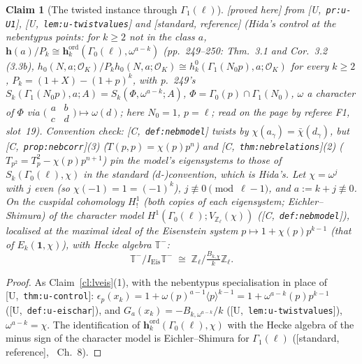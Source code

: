 \documentclass[11pt]{article}
\newtheorem{claim}[theorem]{Claim}
\theoremstyle{remark}
\newcommand{\Z}{\mathbb{Z}}
\newcommand{\Ga}{\Gamma}
\newcommand{\T}{\mathbb{T}}
\newcommand{\HA}[1]{[C,~\texttt{#1}]}      %
\newcommand{\PROVED}{\textsf{[proved here]}}
\newcommand{\STD}{\textsf{[standard, reference]}}
\newcommand{\Ucite}[1]{[U,~\texttt{#1}]}               %
\begin{document}
\begin{claim}[The twisted instance through $\Ga_1(\ell)$]\label{cl:lvtwist}
\PROVED{} from \Ucite{pr:u-U1}, \Ucite{lem:u-twistvalues} and \STD{} (Hida's control at the nebentypus points: for $k\ge2$ \emph{not} in the class $a$,
$\mathbf h(a)/P_{k}\cong\mathbf h^{\mathrm{ord}}_k(\Ga_0(\ell),\omega^{a-k})$ \cite{hida_ens} (pp.~249--250: Thm.~3.1 and Cor.~3.2 (3.3b), $h_0(N,a;\mathcal O_K)/P_kh_0(N,a;\mathcal O_K)\cong
h^{0}_k(\Ga_1(N_0p),a;\mathcal O_K)$ for \emph{every} $k\ge2$, $P_k=(1+X)-(1+p)^{k}$, with p.~249's $S_k(\Ga_1(N_0p),a;A)=S_k(\Phi,\omega^{a-k};A)$, $\Phi=\Ga_0(p)\cap\Ga_1(N_0)$,
$\omega$ a character of $\Phi$ via $\bigl(\begin{smallmatrix}a&b\\c&d\end{smallmatrix}\bigr)\mapsto\omega(d)$; here $N_0=1$, $p=\ell$; read on the page by referee F1, slot~19).
Convention check: \HA{def:nebmodel} twists by $\chi(a_\gamma)=\bar\chi(d_\gamma)$, but \HA{prop:nebcorr}(3) ($T(p,p)=\chi(p)p^{n}$) and \HA{thm:nebrelations}(2)
($T_{p^{2}}=T_p^{2}-\chi(p)p^{n+1}$) pin the model's eigensystems to those of $S_k(\Ga_0(\ell),\chi)$ in the standard ($d$-)convention, which is Hida's. Let $\chi=\omega^{j}$
with $j$ even (so $\chi(-1)=1=(-1)^{k}$), $j\not\equiv0\pmod{\ell-1}$, and $a:=k+j\not\equiv0$. On the cuspidal cohomology $H^{1}_{!}$ (both copies of each eigensystem; Eichler--Shimura) of
the character model $H^{1}(\Ga_0(\ell);V_{\Z_\ell}(\chi))$ (\HA{def:nebmodel}), localised at the maximal ideal of the Eisenstein system $p\mapsto1+\chi(p)p^{k-1}$ (that of $E_k(\mathbf1,\chi)$), with Hecke algebra $\T^{-}$:
\[
  \T^{-}/I_{\mathrm{Eis}}\T^{-}\;\cong\;\Z_\ell\big/\tfrac{B_{k,\chi}}{k}\Z_\ell.
\]
\end{claim}

\begin{proof}
As Claim~\ref{cl:lveis}(1), with the nebentypus specialisation in place of \Ucite{thm:u-control}: $\epsilon_p(x_k)=1+\omega(p)^{a-1}\langle p\rangle^{k-1}=1+\omega^{a-k}(p)p^{k-1}$
(\Ucite{def:u-eischar}), and $G_a(x_k)=-B_{k,\omega^{a-k}}/k$ (\Ucite{lem:u-twistvalues}), $\omega^{a-k}=\chi$. The identification of $\mathbf h^{\mathrm{ord}}_k(\Ga_0(\ell),\chi)$
with the Hecke algebra of the minus sign of the character model is Eichler--Shimura for $\Ga_1(\ell)$ (\STD, \cite{shimura}~Ch.~8).
\end{proof}
\end{document}

